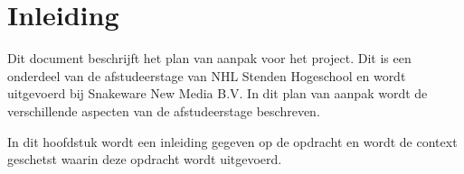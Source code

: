 \chapter{Inleiding}
Dit document beschrijft het plan van aanpak voor het \qw{\ProjectName} project.
Dit is een onderdeel van de afstudeerstage van NHL Stenden Hogeschool en wordt uitgevoerd bij Snakeware New Media B.V.
In dit plan van aanpak wordt de verschillende aspecten van de afstudeerstage beschreven.

\whitespace
In dit hoofdstuk wordt een inleiding gegeven op de opdracht en wordt de context geschetst waarin deze opdracht wordt uitgevoerd.



% 
% 
